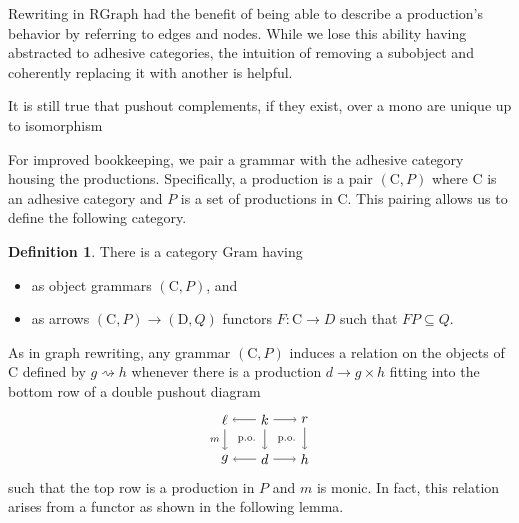 \documentclass{amsart}
\newcommand{\C}{\cat{C}}
\newcommand{\D}{\cat{D}}
\newcommand{\RGraph}{\cat{RGraph}}
\newcommand{\Gram}{\cat{Gram}}
\newcommand{\cat}[1]{\mathrm{#1}}
\newcommand{\from}{\colon}
\newcommand{\dderiv}[2]{#1 \rightsquigarrow #2}
\newcommand{\spn}[3]{#2 \to #1 \times #3}
\theoremstyle{remark}
\theoremstyle{definition}
\newtheorem{definition}[theorem]{Definition}
\begin{document}
Rewriting in $ \RGraph $ had the benefit of being able to describe a
production's behavior by referring to edges and nodes. While we lose
this ability having abstracted to adhesive categories, the intuition
of removing a subobject and coherently replacing it with another
is helpful.

It is still true that pushout complements, if they exist, over a mono
are unique up to isomorphism \cite[Lem.~15]{LackSobo_Adhesive}

For improved bookkeeping, we pair a grammar with the adhesive category
housing the productions. Specifically, a production is a pair $ ( \C ,
P) $ where $ \C $ is an adhesive category and $ P $ is a set of
productions in $ \C $. This pairing allows us to define the following category.

\begin{definition}
  There is a category $ \Gram $ having
  \begin{itemize}
  \item as object grammars $ ( \C , P ) $, and
  \item as arrows $ ( \C , P ) \to ( \D , Q ) $ functors $ F \from
    \C \to D $ such that $ FP \subseteq Q $.
  \end{itemize}
\end{definition}

As in graph rewriting, any grammar $ ( \C , P ) $ induces a relation
on the objects of $ \C $ defined by $ \dderiv{g}{h} $ whenever there
is a production $ \spn{g}{d}{h} $ fitting into the bottom row of a
double pushout diagram
%
\[
  \begin{tikzpicture}
    \node (1) at (0,1) {\( \ell \)};
    \node (2) at (1,1) {\( k \)};
    \node (3) at (2,1) {\( r \)};
    \node (4) at (0,0) {\( g \)};
    \node (5) at (1,0) {\( d \)};
    \node (6) at (2,0) {\( h \)};
    \draw [->] (2) to node [] {\scriptsize{\( \)}} (1);
    \draw [->] (2) to node [] {\scriptsize{\( \)}} (3);
    \draw [->] (5) to node [] {\scriptsize{\( \)}} (4);
    \draw [->] (5) to node [] {\scriptsize{\( \)}} (6);
    \draw [->] (1) to node [left] {\scriptsize{\( m \)}} (4);
    \draw [->] (2) to node [] {\scriptsize{\( \)}} (5);
    \draw [->] (3) to node [] {\scriptsize{\( \)}} (6);
    \node () at (0.5,0.5) {\scriptsize{ p.o.\ }};
    \node () at (1.5,0.5) {\scriptsize{ p.o.\ }};
  \end{tikzpicture}
\]
% 
such that the top row is a production in $ P $ and $ m $ is monic. In
fact, this relation arises from a functor as shown in the following lemma. 
\end{document}
